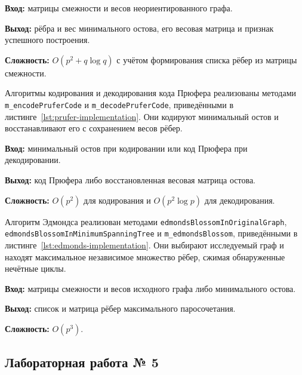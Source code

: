 \textbf{Вход:} матрицы смежности и весов неориентированного графа.

\textbf{Выход:} рёбра и вес минимального остова, его весовая матрица и признак успешного построения.

\textbf{Сложность:} $O(p^2+q\log q)$ с учётом формирования списка рёбер из матрицы смежности.


Алгоритмы кодирования и декодирования кода Прюфера реализованы методами \texttt{m\_encodePruferCode} и \texttt{m\_decodePruferCode}, приведёнными в листинге~\ref{lst:prufer-implementation}. Они кодируют минимальный остов и восстанавливают его с сохранением весов рёбер.

\textbf{Вход:} минимальный остов при кодировании или код Прюфера при декодировании.

\textbf{Выход:} код Прюфера либо восстановленная весовая матрица остова.

\textbf{Сложность:} $O(p^2)$ для кодирования и $O(p^2\log p)$ для декодирования.


Алгоритм Эдмондса реализован методами \texttt{edmondsBlossom\allowbreak{}InOriginalGraph}, \texttt{edmondsBlossom\allowbreak{}InMinimumSpanningTree} и \texttt{m\_edmondsBlossom}, приведёнными в листинге~\ref{lst:edmonds-implementation}. Они выбирают исследуемый граф и находят максимальное независимое множество рёбер, сжимая обнаруженные нечётные циклы.

\textbf{Вход:} матрицы смежности и весов исходного графа либо минимального остова.

\textbf{Выход:} список и матрица рёбер максимального паросочетания.

\textbf{Сложность:} $O(p^3)$.


\subsection{Лабораторная работа № 5}

